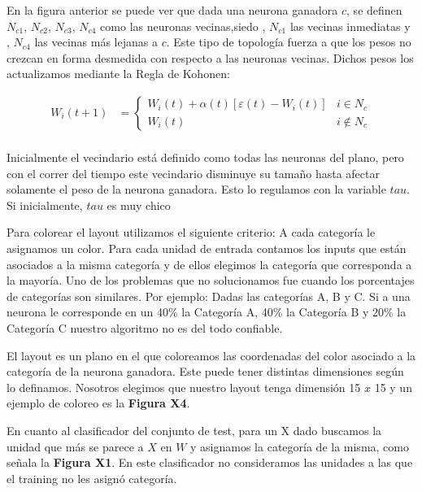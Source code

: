 En la figura anterior se puede ver que dada una neurona ganadora $c$, se definen $N_{c1}$, $N_{c2}$, $N_{c3}$, $N_{c4}$ como las neuronas vecinas,siedo , $N_{c1}$ las vecinas inmediatas y , $N_{c4}$ las vecinas más lejanas a $c$. Este tipo de topología fuerza a que los pesos no crezcan en forma desmedida con respecto a las neuronas vecinas. Dichos pesos los actualizamos mediante la Regla de Kohonen:

\begin{align*}
	W_{i}(t+1) &=  \begin{cases}
						W_{i}(t) + \alpha(t) [ \varepsilon(t) - W_{i}(t) ] & i \in N_{c} \\
						W_{i}(t)                                           & i \not \in N_{c}  
					\end{cases} \\
\end{align*}

Inicialmente el vecindario está definido como todas las neuronas del plano, pero con el correr del tiempo 
este vecindario disminuye su tamaño hasta afectar solamente el peso de la neurona ganadora. Esto lo regulamos con la variable $tau$. Si inicialmente, $tau$ es muy chico



Para colorear el layout utilizamos el siguiente criterio: A cada categoría le asignamos un color. Para cada unidad de entrada contamos los inputs  que están asociados a la misma categoría y de ellos elegimos la categoría que corresponda a la mayoría. Uno de los problemas que no solucionamos fue cuando los porcentajes de categorías son similares. Por ejemplo: Dadas las categorías A, B y C. Si a una neurona le corresponde en un 40$\%$ la Categoría A, 40$\%$ la Categoría B y 20$\%$ la Categoría C nuestro algoritmo no es del todo confiable.

El layout es un plano en el que coloreamos las coordenadas del color asociado a la categoría de la neurona ganadora. Este puede tener distintas dimensiones según lo definamos. Nosotros elegimos que nuestro layout tenga dimensión 15 $x$ 15 y un ejemplo de coloreo es la \textbf{Figura X4}.


En cuanto al clasificador del conjunto de test, para un X dado buscamos la unidad que más se parece a $X$ en $W$ y asignamos la categoría de la misma, como señala la \textbf{Figura X1}. En este clasificador no consideramos las unidades a las que el training no les asignó categoría.


